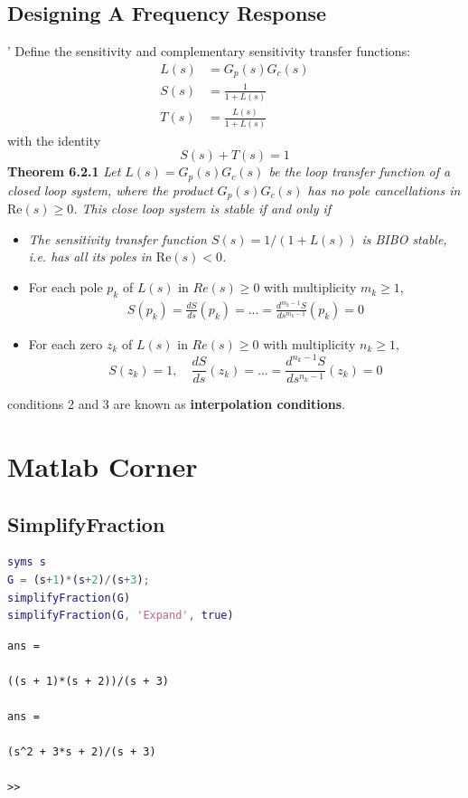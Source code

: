 \documentclass[letterpaper,12pt]{article}
\begin{document}
\subsection{Designing A Frequency Response}'
Define the sensitivity and complementary sensitivity transfer functions:
\begin{align*}
    L(s) &= G_p(s) G_c(s) \\
    S(s) &= \frac{1}{1 + L(s)} \\
    T(s) &= \frac{L(s)}{1 + L(s)} 
\end{align*}
with the identity
\begin{equation*}
    S(s) + T(s) = 1
\end{equation*}
\textbf{Theorem 6.2.1} \textit{
Let $L(s) = G_p(s) G_c(s)$ be the loop transfer function of a closed loop
system, where the product $G_p(s) G_c(s)$ has no pole cancellations in $\text{Re}(s) \geq 0$. This close loop system
is stable if and only if}
\begin{itemize}
    \item \textit{The sensitivity transfer function $S(s) = 1/(1 + L(s))$ is BIBO stable, i.e. has all its poles in $\text{Re}(s) < 0$.}
    \item For each pole $p_k$ of $L(s)$ in $Re(s) \geq 0$ with multiplicity $m_k \geq 1$, 
    \begin{align*}
        S(p_k) = \frac{dS}{ds}(p_k) = ... = \frac{d^{m_k - 1}S}{ds^{m_k - 1}}(p_k) = 0
    \end{align*}
    \item For each zero $z_k$ of $L(s)$ in $Re(s) \geq 0$ with multiplicity $n_k \geq 1$,
    \[
        S(z_k) = 1, \quad \frac{dS}{ds}(z_k) = ... = \frac{d^{n_k - 1}S}{ds^{n_k - 1}}(z_k) = 0
    \]
\end{itemize}
conditions 2 and 3 are known as \textbf{interpolation conditions}.


\section{Matlab Corner}
\subsection{SimplifyFraction}
\begin{lstlisting}[language=Matlab]
syms s
G = (s+1)*(s+2)/(s+3);
simplifyFraction(G)
simplifyFraction(G, 'Expand', true)
\end{lstlisting}
\begin{verbatim}
ans =

((s + 1)*(s + 2))/(s + 3)

ans =

(s^2 + 3*s + 2)/(s + 3)

>> 
\end{verbatim}
\end{document}
